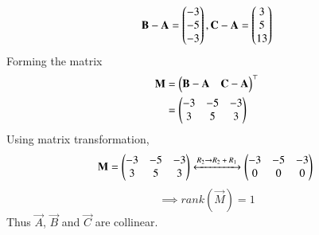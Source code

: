 
\begin{equation}
    \mathbf{B} - \mathbf{A} = \begin{pmatrix}-3\\-5\\-3\end{pmatrix}, \mathbf{C} - \mathbf{A} = \begin{pmatrix}3\\5\\13\end{pmatrix}
\end{equation}
Forming the matrix 
\begin{align}
    \mathbf{M} &= \begin{pmatrix}
    \mathbf{B} -  \mathbf{A} & \mathbf{C} - \mathbf{A}\\
    \end{pmatrix}^\top\\
    &= \begin{pmatrix}
    -3 & -5 & -3\\
    3 & 5 & 3\end{pmatrix}
\end{align}
Using matrix transformation,
\begin{align}
 \mathbf{M} = \begin{pmatrix}
    -3 & -5 & -3\\
    3 & 5 & 3\end{pmatrix}
    \xleftrightarrow{\text{$R_2$}\rightarrow{\text{$R_2 + R_1$ }}}
 \begin{pmatrix}
 -3 & -5 & -3\\
 0 & 0 & 0\end{pmatrix}\
\end{align}
\begin{equation}
   \implies rank(\vec{M}) = 1 
\end{equation}
Thus $\vec{A}$, $\vec{B}$ and $\vec{C}$ are collinear.
